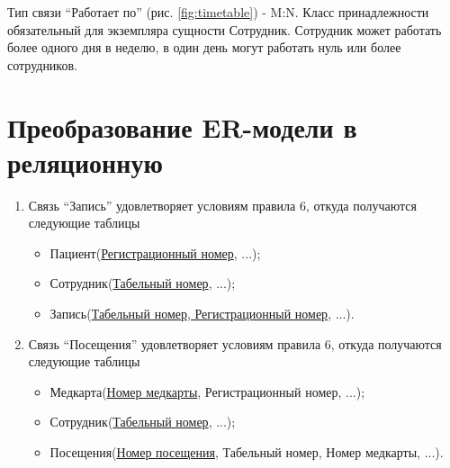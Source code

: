 \documentclass[14pt,a4paper,russian]{extreport}
\begin{document}
Тип связи ``Работает по'' (рис. \ref{fig:timetable}) - M:N.
Класс принадлежности обязательный для экземпляра сущности Сотрудник.
Сотрудник может работать более одного дня в неделю, в один день
могут работать нуль или более сотрудников.

\section{Преобразование ER-модели в реляционную}
\begin{enumerate}[noitemsep]
\renewcommand\labelitemi{--}
    \item Связь ``Запись'' удовлетворяет условиям правила 6, откуда получаются следующие
        таблицы
	\begin{itemize}[noitemsep]
            \item Пациент(\underline{Регистрационный номер}, ...);
            \item Сотрудник(\underline{Табельный номер}, ...);
            \item Запись(\underline{Табельный номер, Регистрационный номер}, ...).
        \end{itemize}
    \item Связь ``Посещения'' удовлетворяет условиям правила 6, откуда получаются следующие
        таблицы
	\begin{itemize}[noitemsep]
            \item Медкарта(\underline{Номер медкарты}, Регистрационный номер, ...);
            \item Сотрудник(\underline{Табельный номер}, ...);
	    \item Посещения(\underline{Номер посещения}, Табельный номер, Номер медкарты, ...).
        \end{itemize}


\end{enumerate}
\end{document}
